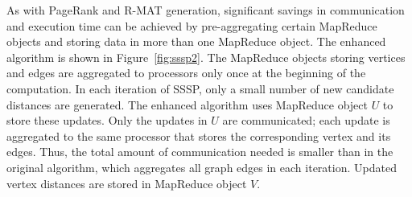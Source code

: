 As with PageRank and R-MAT generation, significant savings in
communication and execution time can be achieved by pre-aggregating
certain MapReduce objects and storing data in more than one MapReduce
object.  The enhanced algorithm is shown in Figure~\ref{fig:sssp2}.
The MapReduce objects storing vertices and edges are aggregated to
processors only once at the beginning of the computation.  In each
iteration of SSSP, only a small number of new candidate distances are
generated.  The enhanced algorithm uses MapReduce object $U$ to store
these updates.  Only the updates in $U$ are communicated; each update
is aggregated to the same processor that stores the corresponding
vertex and its edges.  Thus, the total amount of communication needed
is smaller than in the original algorithm, which aggregates all graph
edges in each iteration.  Updated vertex distances are stored in
MapReduce object $V$.

